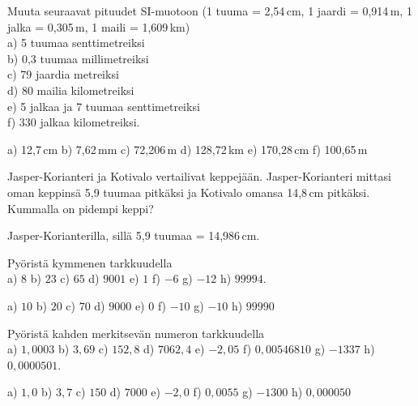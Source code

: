 \begin{tehtavasivu}
\begin{tehtava}
Muuta seuraavat pituudet SI-muotoon (1 tuuma = 2,54\,cm, 1 jaardi = 0,914\,m, 1 jalka = 0,305\,m, 1 maili = 1,609\,km) \\
a) 5 tuumaa senttimetreiksi \\
b) 0,3 tuumaa millimetreiksi \\
c) 79 jaardia metreiksi \\
d) 80 mailia kilometreiksi \\
e) 5 jalkaa ja 7 tuumaa senttimetreiksi \\
f) 330 jalkaa kilometreiksi.
\begin{vastaus}
a) 12,7\,cm \qquad
b) 7,62\,mm \qquad
c) 72,206\,m \qquad
d) 128,72\,km \qquad
e) 170,28\,cm \qquad
f) 100,65\,m
\end{vastaus}
\end{tehtava}

\begin{tehtava}
Jasper-Korianteri ja Kotivalo vertailivat keppejään. Jasper-Korianteri mittasi oman keppinsä 5,9 tuumaa pitkäksi ja Kotivalo omansa 14,8\,cm pitkäksi. Kummalla on pidempi keppi?
\begin{vastaus}
Jasper-Korianterilla, sillä 5,9 tuumaa = 14,986\,cm.
\end{vastaus}
\end{tehtava}

\begin{tehtava}
Pyöristä kymmenen tarkkuudella \\
a) $8$ \qquad
b) $23$ \qquad
c) $65$ \qquad
d) $9001$ \qquad
e) $1$ \qquad
f) $-6$ \qquad
g) $-12$ \qquad
h) $99994$.
\begin{vastaus}
a) $10$ \qquad
b) $20$ \qquad
c) $70$ \qquad
d) $9000$ \qquad
e) $0$ \qquad
f) $-10$ \qquad
g) $-10$ \qquad
h) $99990$
\end{vastaus}
\end{tehtava}

\begin{tehtava}
Pyöristä kahden merkitsevän numeron tarkkuudella \\
a) $1,0003$ \qquad
b) $3,69$ \qquad
c) $152,8$ \qquad
d) $7062,4$ \qquad
e) $-2,05$ \qquad
f) $0,00546810$ \qquad
g) $-1337$ \qquad
h) $0,0000501$.
\begin{vastaus}
a) $1,0$ \qquad
b) $3,7$ \qquad
c) $150$ \qquad
d) $7000$ \qquad
e) $-2,0$ \qquad
f) $0,0055$ \qquad
g) $-1300$ \qquad
h) $0,000050$
\end{vastaus}
\end{tehtava}


\end{tehtavasivu}
